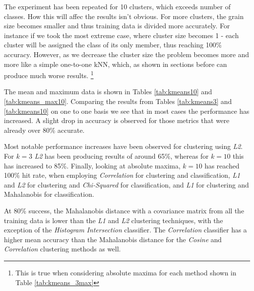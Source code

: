 \documentclass[10pt,twocolumn,letterpaper]{article}
\begin{document}
The experiment has been repeated for 10 clusters, which exceeds number of classes. How this will affec the results isn't obvious. For more clusters, the grain size becomes smaller and thus training data is divided more accurately. For instance if we took the most extreme case, where cluster size becomes 1 - each cluster will be assigned the class of its only member, thus reaching 100\% accuracy. However, as we decrease the cluster size the problem becomes more and more like a simple one-to-one kNN, which, as shown in sections before can produce much worse results. \footnote{This is true when considering absolute maxima for each method shown in Table \ref{tab:kmeans_3max}}

The mean and maximum data is shown in Tables \ref{tab:kmeans10}
and \ref{tab:kmeans_max10}. Comparing the results from Tables \ref{tab:kmeans3} and \ref{tab:kmeans10} on one to one basis we see that in most cases the performance has increased. A slight drop in accuracy is observed for those metrics that were already over 80\% accurate. 

Most notable performance increases have been observed for clustering using \textit{L2}. For $k=3$ \textit{L2} has been producing results of around 65\%, whereas for $k=10$ this has increased to 85\%. Finally, looking at absolute maxima, $k=10$ has reached 100\% hit rate, when employing \textit{Correlation} for clustering and classification, \textit{L1} and \textit{L2} for clustering and \textit{Chi-Squared} for classification, and \textit{L1} for clustering and Mahalanobis for classification.

At 80\% success, the Mahalanobis distance with a covariance matrix from all the training data is lower than the \textit{L1} and \textit{L2} clustering techniques, with the exception of the \textit{Histogram Intersection} classifier. The \textit{Correlation} classifier has a higher mean accuracy than the Mahalanobis distance for the \textit{Cosine} and \textit{Correlation} clustering methods as well.
\end{document}
